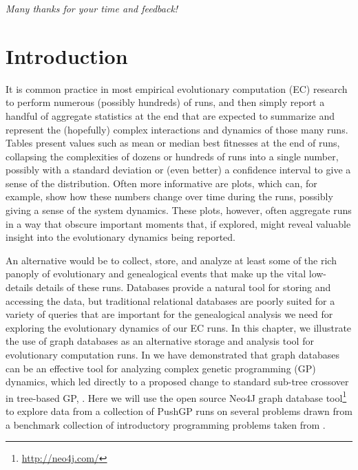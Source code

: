 \emph{Many thanks for your time and feedback!}

\section{Introduction}
\label{sec:introduction}

It is common practice in most empirical evolutionary computation (EC) 
research to perform numerous (possibly hundreds) of runs, and then simply 
report a handful of aggregate statistics at the end that are expected to summarize and represent 
the (hopefully) complex interactions and dynamics of those many runs. Tables present values such 
as mean or median best fitnesses at the end of runs, collapsing the complexities of dozens or 
hundreds of runs into a single number, possibly with a standard deviation or (even better) a 
confidence interval to give a sense of the distribution. Often more informative are plots, which can, 
for example, show how these numbers change over time during the runs, possibly giving a sense of 
the system dynamics. These plots, however, often aggregate runs in a way that obscure important 
moments that, if explored, might reveal valuable insight into the evolutionary dynamics being 
reported.

An alternative would be to collect, store, and analyze at least some of the rich panoply of 
evolutionary and genealogical events that make up the vital low-details details of these runs. 
Databases provide a natural tool for 
storing and accessing the data, but traditional relational
databases are poorly suited for a variety of queries that are important for the genealogical analysis
we need for exploring the evolutionary dynamics of our EC runs.
In this chapter, we illustrate the use of graph databases as an alternative storage and analysis tool for
evolutionary computation runs. In \cite{donatuccianalysis} we have demonstrated that graph databases
can be an effective tool for analyzing complex genetic programming (GP) dynamics, which led directly
to a proposed change to standard sub-tree crossover in tree-based GP, \cite{mcphee:GECCO15}.
Here we will use the open source Neo4J graph database tool\footnote{\url{http://neo4j.com/}} 
to explore data from a
collection of PushGP runs on several problems drawn from a benchmark collection of introductory 
programming problems taken from \cite{Helmuth:2015:GECCO}.

